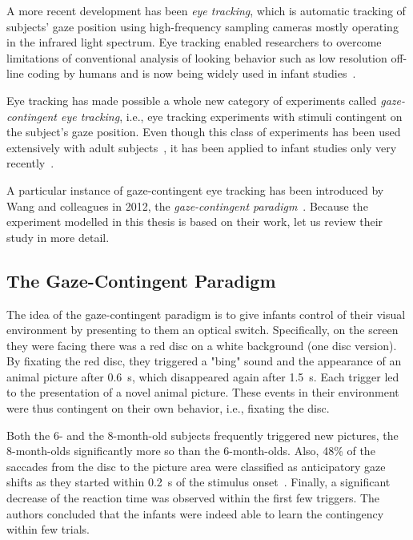 \documentclass[a4paper]{scrreprt}
\begin{document}
A more recent development has been \textit{eye tracking}, which is automatic tracking of subjects' gaze position using high-frequency sampling cameras mostly operating in the infrared light spectrum. Eye tracking enabled researchers to overcome limitations of conventional analysis of looking behavior such as low resolution off-line coding by humans and is now being widely used in infant studies~\cite{johnson03,mcmurray04,gredebaeck09,oakes12,aslin12}.

Eye tracking has made possible a whole new category of experiments called \textit{gaze-contingent eye tracking}, i.e., eye tracking experiments with stimuli contingent on the subject's gaze position. Even though this class of experiments has been used extensively with adult subjects~\cite{reader73,duchowski02}, it has been applied to infant studies only very recently~\cite{holmboe08,deligianna11,wass11,tummeltshammer14,miyazaki14}.

A particular instance of gaze-contingent eye tracking has been introduced by Wang and colleagues in 2012, the \textit{gaze-contingent paradigm}~\cite{wang12}. Because the experiment modelled in this thesis is based on their work, let us review their study in more detail.



\subsection{The Gaze-Contingent Paradigm}
\label{sec:gcp}

The idea of the gaze-contingent paradigm is to give infants control of their visual environment by presenting to them an optical switch. Specifically, on the screen they were facing there was a red disc on a white background (one disc version). By fixating the red disc, they triggered a "bing" sound and the appearance of an animal picture after 0.6~s, which disappeared again after 1.5~s. Each trigger led to the presentation of a novel animal picture. These events in their environment were thus contingent on their own behavior, i.e., fixating the disc.

Both the 6- and the 8-month-old subjects frequently triggered new pictures, the 8-month-olds significantly more so than the 6-month-olds. Also, 48\% of the saccades from the disc to the picture area were classified as anticipatory gaze shifts as they started within 0.2~s of the stimulus onset~\cite{haith88}. Finally, a significant decrease of the reaction time was observed within the first few triggers. The authors concluded that the infants were indeed able to learn the contingency within few trials.
\end{document}
